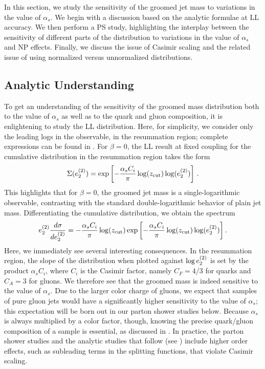 
In this section, we study the sensitivity of the groomed jet mass to variations in the value of $\alpha_s$.
%
We begin with a discussion based on the analytic formulae at LL accuracy.
%
We then perform a PS study, highlighting the interplay between the sensitivity of different parts of the distribution to variations in the value of $\alpha_s$ and NP effects.
%
Finally, we discuss the issue of Casimir scaling and the related issue of using normalized versus unnormalized distributions.


\subsection{Analytic Understanding}
\label{sec:analytic}

To get an understanding of the sensitivity of the groomed mass distribution both to the value of $\alpha_s$ as well as to the quark and gluon composition, it is enlightening to study the LL distribution.
%
Here, for simplicity, we consider only the leading logs in the observable, in the resummation region; complete expressions can be found in .
%
For $\beta=0$, the LL result at fixed coupling for the cumulative distribution in the resummation region takes the form
%
\begin{align}
\Sigma(e_{2}^{(2)})=\exp\left[ - \frac{\alpha_s C_i}{\pi} \log(z_{\rm cut}) \log (e_{2}^{(2)}) \right]\,.
\end{align}
%
This highlights that for $\beta=0$, the groomed jet mass is a single-logarithmic observable, contrasting with the standard double-logarithmic behavior of plain jet mass.
%
Differentiating the cumulative distribution, we obtain the spectrum
%
\begin{align}
\label{eq:ecf_ll_dsitribution}
e_{2}^{(2)}  \frac{d\sigma}{d e_{2}^{(2)}}=   - \frac{\alpha_s C_i}{\pi} \log(z_{\rm cut})   \exp\left[ - \frac{\alpha_s C_i}{\pi}  \log(z_{\rm cut}) \log (e_{2}^{(2)}) \right].
\end{align}
%
Here, we immediately see several interesting consequences.
%
In the resummation region, the slope of the distribution when plotted against $\log e_{2}^{(2)}$ is set by the product $\alpha_s C_i$, where $C_i$ is the Casimir factor, namely $C_F = 4/3$ for quarks and $C_A = 3$ for gluons.
%
We therefore see that the groomed mass is indeed sensitive to the value of $\alpha_s$.
%
Due to the larger color charge of gluons, we expect that samples of pure gluon jets would have a significantly higher sensitivity to the value of $\alpha_s$; this expectation will be born out in our parton shower studies below.
%
Because $\alpha_s$ is always multiplied by a color factor, though, knowing the precise quark/gluon composition of a sample is essential, as discussed in .
%
In practice, the parton shower studies and the analytic studies that follow (see ) include higher order effects, such as subleading terms in the splitting functions, that violate Casimir scaling.

